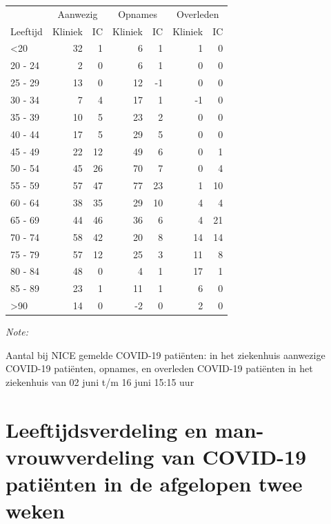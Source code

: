 \documentclass[
  english,
  man,floatsintext]{apa6}
\begin{document}
\begin{table}
\centering\begingroup\fontsize{10}{12}\selectfont

\begin{threeparttable}
\begin{tabular}{lrrrrrr}
\toprule
\multicolumn{1}{c}{ } & \multicolumn{2}{c}{Aanwezig} & \multicolumn{2}{c}{Opnames} & \multicolumn{2}{c}{Overleden} \\
\cmidrule(l{3pt}r{3pt}){2-3} \cmidrule(l{3pt}r{3pt}){4-5} \cmidrule(l{3pt}r{3pt}){6-7}
Leeftijd & Kliniek & IC & Kliniek & IC & Kliniek & IC\\
\midrule
<20 & 32 & 1 & 6 & 1 & 1 & 0\\
20 - 24 & 2 & 0 & 6 & 1 & 0 & 0\\
25 - 29 & 13 & 0 & 12 & -1 & 0 & 0\\
30 - 34 & 7 & 4 & 17 & 1 & -1 & 0\\
35 - 39 & 10 & 5 & 23 & 2 & 0 & 0\\
40 - 44 & 17 & 5 & 29 & 5 & 0 & 0\\
45 - 49 & 22 & 12 & 49 & 6 & 0 & 1\\
50 - 54 & 45 & 26 & 70 & 7 & 0 & 4\\
55 - 59 & 57 & 47 & 77 & 23 & 1 & 10\\
60 - 64 & 38 & 35 & 29 & 10 & 4 & 4\\
65 - 69 & 44 & 46 & 36 & 6 & 4 & 21\\
70 - 74 & 58 & 42 & 20 & 8 & 14 & 14\\
75 - 79 & 57 & 12 & 25 & 3 & 11 & 8\\
80 - 84 & 48 & 0 & 4 & 1 & 17 & 1\\
85 - 89 & 23 & 1 & 11 & 1 & 6 & 0\\
>90 & 14 & 0 & -2 & 0 & 2 & 0\\
\bottomrule
\end{tabular}
\begin{tablenotes}
\item \textit{Note: } 
\item Aantal bij NICE gemelde COVID-19 patiënten: in het ziekenhuis aanwezige COVID-19 patiënten, opnames, en overleden COVID-19 patiënten in het ziekenhuis van 02 juni t/m 16 juni 15:15 uur
\end{tablenotes}
\end{threeparttable}
\endgroup{}
\end{table}

\newpage

\hypertarget{leeftijdsverdeling-en-man-vrouwverdeling-van-covid-19-patiuxebnten-in-de-afgelopen-twee-weken}{%
\section{Leeftijdsverdeling en man-vrouwverdeling van COVID-19 patiënten in de afgelopen twee weken}\label{leeftijdsverdeling-en-man-vrouwverdeling-van-covid-19-patiuxebnten-in-de-afgelopen-twee-weken}}
\end{document}
